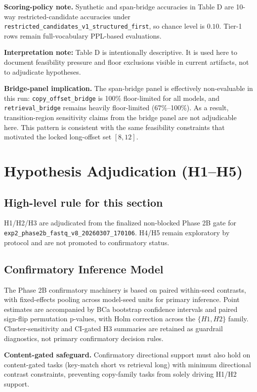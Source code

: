 \documentclass[11pt]{article}
\begin{document}
\noindent
\textbf{Scoring-policy note.} Synthetic and span-bridge accuracies in Table D are 10-way restricted-candidate accuracies under \texttt{restricted\_candidates\_v1\_structured\_first}, so chance level is \(0.10\). Tier-1 rows remain full-vocabulary PPL-based evaluations.

\noindent
\textbf{Interpretation note:} Table D is intentionally descriptive. It is used here to document feasibility pressure and floor exclusions visible in current artifacts, not to adjudicate hypotheses.

\noindent
\textbf{Bridge-panel implication.} The span-bridge panel is effectively non-evaluable in this run: \texttt{copy\_offset\_bridge} is 100\% floor-limited for all models, and \texttt{retrieval\_bridge} remains heavily floor-limited (67\%--100\%). As a result, transition-region sensitivity claims from the bridge panel are not adjudicable here. This pattern is consistent with the same feasibility constraints that motivated the locked long-offset set \([8,12]\).

\section{Hypothesis Adjudication (H1--H5)}
\subsection*{High-level rule for this section}
H1/H2/H3 are adjudicated from the finalized non-blocked Phase 2B gate for \texttt{exp2\_phase2b\_fastq\_v8\_20260307\_170106}. H4/H5 remain exploratory by protocol and are not promoted to confirmatory status.

\subsection*{Confirmatory Inference Model}
The Phase 2B confirmatory machinery is based on paired within-seed contrasts, with fixed-effects pooling across model-seed units for primary inference. Point estimates are accompanied by BCa bootstrap confidence intervals and paired sign-flip permutation p-values, with Holm correction across the \(\{H1,H2\}\) family. Cluster-sensitivity and CI-gated H3 summaries are retained as guardrail diagnostics, not primary confirmatory decision rules.

\noindent
\textbf{Content-gated safeguard.} Confirmatory directional support must also hold on content-gated tasks (key-match short vs retrieval long) with minimum directional contrast constraints, preventing copy-family tasks from solely driving H1/H2 support.
\end{document}
